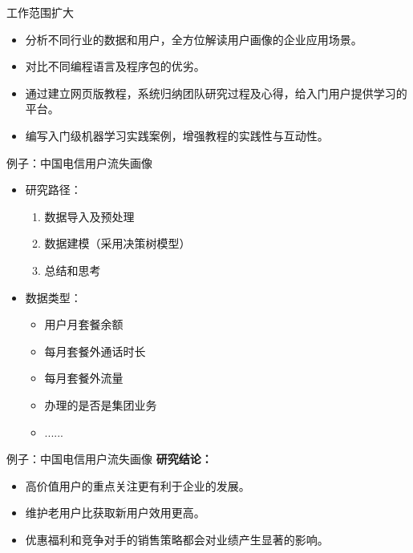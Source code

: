 \documentclass[10pt, aspectratio=32,handout]{beamer}
\begin{document}
\begin{frame}{工作范围扩大}
   \begin{itemize}
      \item 分析不同行业的数据和用户，全方位解读用户画像的企业应用场景。\newline
      \item 对比不同编程语言及程序包的优劣。\newline
      \item 通过建立网页版教程，系统归纳团队研究过程及心得，给入门用户提供学习的平台。\newline
      \item 编写入门级机器学习实践案例，增强教程的实践性与互动性。
   \end{itemize}
\end{frame}

\begin{frame}{例子：中国电信用户流失画像}
\begin{itemize}
\item 研究路径：
  \begin{enumerate}
    \item 数据导入及预处理\newline
    \item 数据建模（采用决策树模型）\newline
    \item 总结和思考\newline
  \end{enumerate}
\item 数据类型：
  \begin{itemize}
    \item 用户月套餐余额\newline
    \item 每月套餐外通话时长\newline
    \item 每月套餐外流量\newline
    \item 办理的是否是集团业务\newline
    \item ......
  \end{itemize}
\end{itemize}
\end{frame}

\begin{frame}{例子：中国电信用户流失画像}
\textbf{研究结论：}\newline
\begin{itemize}
\item 高价值用户的重点关注更有利于企业的发展。\newline
\item 维护老用户比获取新用户效用更高。\newline
\item 优惠福利和竞争对手的销售策略都会对业绩产生显著的影响。\newline
\end{itemize}
\end{frame}
\end{document}
